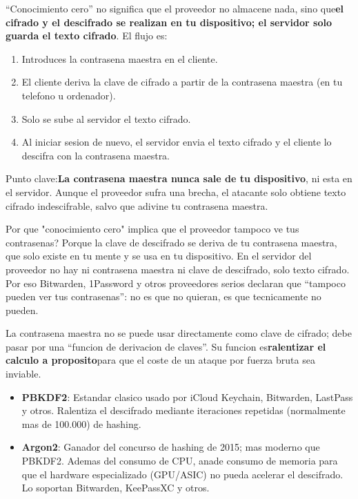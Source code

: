 
“Conocimiento cero” no significa que el proveedor no almacene nada, sino que\textbf{el cifrado y el descifrado se realizan en tu dispositivo; el servidor solo guarda el texto cifrado}. El flujo es:

\begin{enumerate}
  \item Introduces la contrasena maestra en el cliente.
  \item El cliente deriva la clave de cifrado a partir de la contrasena maestra (en tu telefono u ordenador).
  \item Solo se sube al servidor el texto cifrado.
  \item Al iniciar sesion de nuevo, el servidor envia el texto cifrado y el cliente lo descifra con la contrasena maestra.
\end{enumerate}

Punto clave:\textbf{La contrasena maestra nunca sale de tu dispositivo}, ni esta en el servidor. Aunque el proveedor sufra una brecha, el atacante solo obtiene texto cifrado indescifrable, salvo que adivine tu contrasena maestra.

\begin{tcbinfo}{Por que "conocimiento cero" implica que el proveedor tampoco ve tus contrasenas?}
Porque la clave de descifrado se deriva de tu contrasena maestra, que solo existe en tu mente y se usa en tu dispositivo. En el servidor del proveedor no hay ni contrasena maestra ni clave de descifrado, solo texto cifrado. Por eso Bitwarden, 1Password y otros proveedores serios declaran que “tampoco pueden ver tus contrasenas”: no es que no quieran, es que tecnicamente no pueden.

\end{tcbinfo}


La contrasena maestra no se puede usar directamente como clave de cifrado; debe pasar por una “funcion de derivacion de claves”. Su funcion es\textbf{ralentizar el calculo a proposito}para que el coste de un ataque por fuerza bruta sea inviable.

\begin{itemize}
  \item \textbf{PBKDF2}: Estandar clasico usado por iCloud Keychain, Bitwarden, LastPass y otros. Ralentiza el descifrado mediante iteraciones repetidas (normalmente mas de 100.000) de hashing.
  \item \textbf{Argon2}: Ganador del concurso de hashing de 2015; mas moderno que PBKDF2. Ademas del consumo de CPU, anade consumo de memoria para que el hardware especializado (GPU/ASIC) no pueda acelerar el descifrado. Lo soportan Bitwarden, KeePassXC y otros.
\end{itemize}


